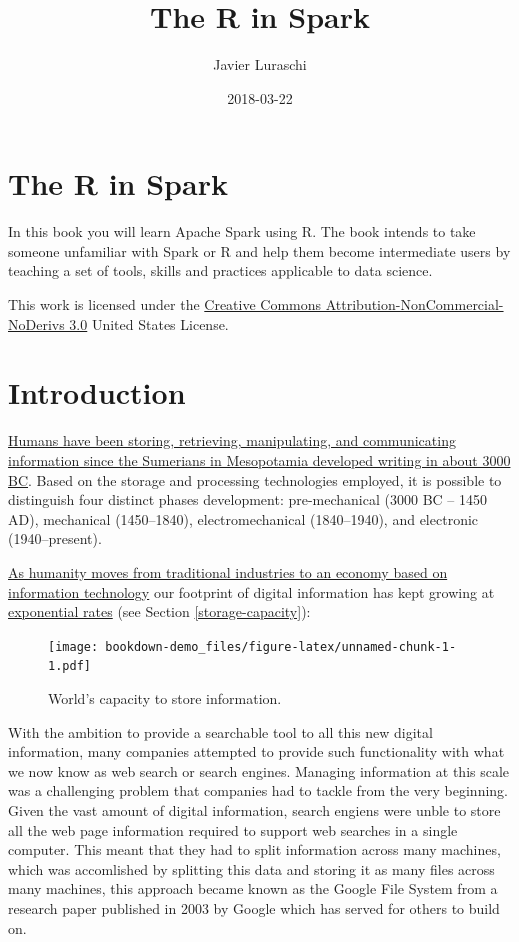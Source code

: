 \documentclass[]{book}
\title{The R in Spark}
\author{Javier Luraschi}
\date{2018-03-22}
\theoremstyle{definition}
\theoremstyle{definition}
\theoremstyle{definition}
\theoremstyle{remark}
\begin{document}
\maketitle

{
\setcounter{tocdepth}{1}
\tableofcontents
}
\chapter*{The R in Spark}\label{the-r-in-spark}

In this book you will learn Apache Spark using R. The book intends to
take someone unfamiliar with Spark or R and help them become
intermediate users by teaching a set of tools, skills and practices
applicable to data science.

This work is licensed under the
\href{http://creativecommons.org/licenses/by-nc-nd/3.0/us/}{Creative
Commons Attribution-NonCommercial-NoDerivs 3.0} United States License.

\chapter{Introduction}\label{intro}

\href{https://en.wikipedia.org/wiki/Information_technology}{Humans have
been storing, retrieving, manipulating, and communicating information
since the Sumerians in Mesopotamia developed writing in about 3000 BC}.
Based on the storage and processing technologies employed, it is
possible to distinguish four distinct phases development: pre-mechanical
(3000 BC -- 1450 AD), mechanical (1450--1840), electromechanical
(1840--1940), and electronic (1940--present).

\href{https://en.wikipedia.org/wiki/Information_Age}{As humanity moves
from traditional industries to an economy based on information
technology} our footprint of digital information has kept growing at
\href{http://documents.worldbank.org/curated/en/896971468194972881/310436360_201602630200201/additional/102725-PUB-Replacement-PUBLIC.pdf}{exponential
rates} (see Section \ref{storage-capacity}):

\begin{figure}
\centering
\texttt{[image: bookdown-demo\_files/figure-latex/unnamed-chunk-1-1.pdf]}
\caption{\label{fig:unnamed-chunk-1}World's capacity to store information.}
\end{figure}

With the ambition to provide a searchable tool to all this new digital
information, many companies attempted to provide such functionality with
what we now know as web search or search engines. Managing information
at this scale was a challenging problem that companies had to tackle
from the very beginning. Given the vast amount of digital information,
search engiens were unble to store all the web page information required
to support web searches in a single computer. This meant that they had
to split information across many machines, which was accomlished by
splitting this data and storing it as many files across many machines,
this approach became known as the Google File System from a research
paper published in 2003 by Google which has served for others to build
on.
\end{document}
